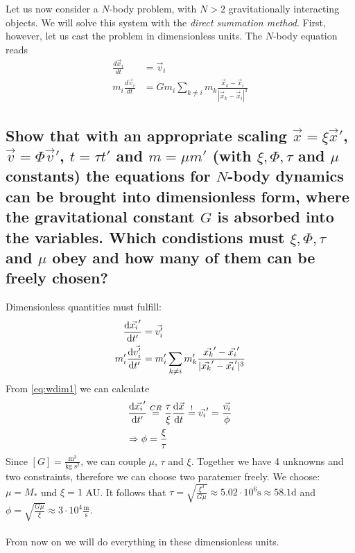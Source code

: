 Let us now consider a $N$-body problem, with $N>2$ gravitationally interacting
objects. We will solve this system with the \textit{direct summation method}.
First, however, let us cast the problem in dimensionless units. The $N$-body
equation reads
\begin{align}
    \frac{d\vec{x}_i}{dt}
    &=\vec{v}_i \\
    m_i\frac{d\vec{v}_i}{dt}
    &=Gm_i\sum_{k\neq i}m_k\frac{\vec{x}_k-\vec{x}_i}{|\vec{x}_k-\vec{x}_i|^3}
\end{align}

\subsection{Show that with an appropriate scaling $\vec x=\xi\vec x'$,
    $\vec v=\Phi\vec v'$, $t=\tau t'$ and $m=\mu m'$ (with $\xi,\Phi,\tau$
    and $\mu$ constants) the equations for $N$-body dynamics can be brought 
    into dimensionless form, where the gravitational constant $G$ is absorbed
    into the variables. Which condistions must $\xi,\Phi,\tau$ and $\mu$ obey
    and how many of them can be freely chosen?
}
    Dimensionless quantities must fulfill:
    \begin{align}
        \frac{\mathrm{d} \vec{x_i}'}{\mathrm{d} t'}
        &= \vec{v_i'} 
        \label{eq:wdim1} \\
        m_i' \frac{\mathrm{d} \vec{v_i'}}{\mathrm{d} t'}
        &= m_i' \sum_{k\neq i} m_k'
        \frac{\vec{x_k}' -\vec{x_i}'}{|\vec{x_k}'-\vec{x_i}'|^3}
 	\label{eq:wdim2}   
    \end{align}
    From \autoref{eq:wdim1} we can calculate 
    \begin{align}
        \frac{\mathrm{d} \vec{x_i}'}{\mathrm{d} t'}&\overset{CR}{=} 
        \frac{\tau}{\xi} \frac{\mathrm{d} \vec{x}}{\mathrm{d} t}
        \overset{!}{=}\vec{v_i}' 
        =\frac{\vec{v_i}}{\phi} \\
        \Rightarrow\phi&=\frac{\xi}{\tau}
    \end{align}
    Since $[G] = \frac{\text{m}^3}{\text{kg } \text{s}^2}$, we can 
    couple $\mu$, $\tau$ and $\xi$. Together we have 4 unknowns and two 
    constraints, therefore we can choose two paratemer freely.
    We choose: $\mu = M_*$ und $\xi=1$ AU. 
    It follows that 
    $\tau=\sqrt{\frac{\xi^3}{G \mu}}\approx 5.02\cdot 10^6\text{s} 
    \approx 58.1 \text{d}$ 
    and $\phi=\sqrt{\frac{G \mu}{\xi}}\approx3\cdot10^4
    \frac{\text{m}}{\text{s}}$. \\
    \\
    From now on we will do everything in these dimensionless units.

